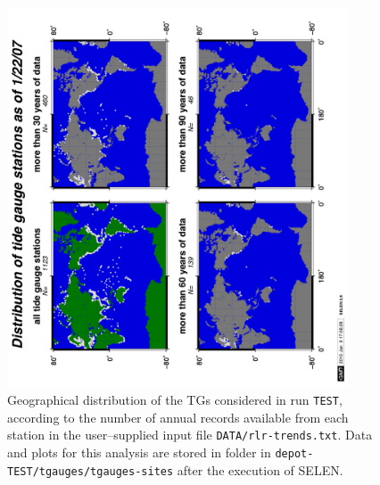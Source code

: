 \documentclass[11pt,fleqn,a4paper,titlepage]{article}
\newcommand\selens{\textsf{SELEN}}
\begin{document}
\begin{figure}[h]
\begin{center}
\noindent\includegraphics[width=0.90\textwidth, angle=-90]{./Figures/map-tgauges.png}
\caption[Tide gauges locations]{\small{Geographical distribution of the TGs considered in run \texttt{TEST}, according to the number of annual records available from each station in the user--supplied input file \texttt{DATA/rlr-trends.txt}. Data and plots for this analysis are stored in folder 
in \texttt{depot-TEST/tgauges/tgauges-sites} after the execution of \selens.}}
\label{fig:tg-distribution}
\end{center}
\end{figure}
\newpage
\end{document}
